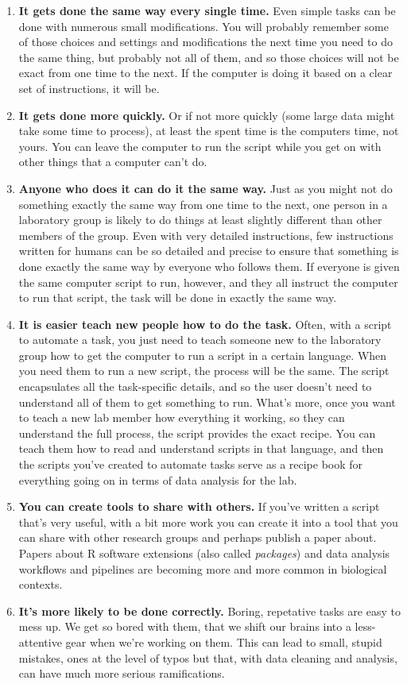 \documentclass[]{tufte-book}
\begin{document}
\begin{enumerate}
\def\labelenumi{\arabic{enumi}.}
\item
  \textbf{It gets done the same way every single time.} Even simple tasks can be done with
  numerous small modifications. You will probably remember some of those choices and
  settings and modifications the next time you need to do the same thing, but probably
  not all of them, and so those choices will not be exact from one time to the next.
  If the computer is doing it based on a clear set of instructions, it will be.
\item
  \textbf{It gets done more quickly.} Or if not more quickly (some large data might take
  some time to process), at least the spent time is the computers time, not yours. You
  can leave the computer to run the script while you get on with other things that
  a computer can't do.
\item
  \textbf{Anyone who does it can do it the same way.} Just as you might not do something
  exactly the same way from one time to the next, one person in a laboratory group is
  likely to do things at least slightly different than other members of the group.
  Even with very detailed instructions, few instructions written for humans can be
  so detailed and precise to ensure that something is done exactly the same way by
  everyone who follows them. If everyone is given the same computer script to run,
  however, and they all instruct the computer to run that script, the task will be
  done in exactly the same way.
\item
  \textbf{It is easier teach new people how to do the task.} Often, with a script to
  automate a task, you just need to teach someone new to the laboratory group how
  to get the computer to run a script in a certain language. When you need them to
  run a new script, the process will be the same. The script encapsulates all the
  task-specific details, and so the user doesn't need to understand all of them to
  get something to run. What's more, once you want to teach a new lab member how
  everything it working, so they can understand the full process, the script provides
  the exact recipe. You can teach them how to read and understand scripts in that
  language, and then the scripts you've created to automate tasks serve as a recipe
  book for everything going on in terms of data analysis for the lab.
\item
  \textbf{You can create tools to share with others.} If you've written a script that's
  very useful, with a bit more work you can create it into a tool that you can share
  with other research groups and perhaps publish a paper about. Papers about R
  software extensions (also called \emph{packages}) and data analysis workflows and
  pipelines are becoming more and more common in biological contexts.
\item
  \textbf{It's more likely to be done correctly.} Boring, repetative tasks are easy
  to mess up. We get so bored with them, that we shift our brains into a less-attentive
  gear when we're working on them. This can lead to small, stupid mistakes, ones
  at the level of typos but that, with data cleaning and analysis, can have much
  more serious ramifications.
\end{enumerate}
\end{document}
